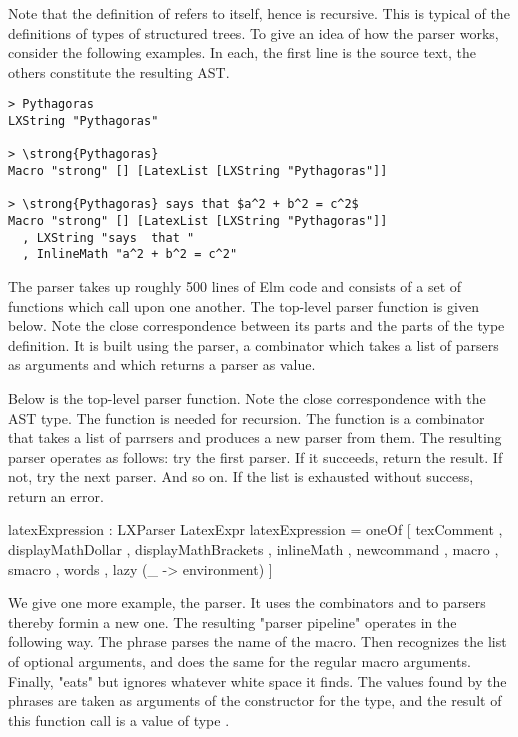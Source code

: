 Note that the definition of  refers to itself, hence is recursive.  This is typical of the definitions of types of structured trees. 
To give an idea of how the parser works, consider the following  examples.  In each, the first line is the source text, the others constitute the resulting AST.

\begin{verbatim}
> Pythagoras
LXString "Pythagoras"

> \strong{Pythagoras}
Macro "strong" [] [LatexList [LXString "Pythagoras"]]

> \strong{Pythagoras} says that $a^2 + b^2 = c^2$
Macro "strong" [] [LatexList [LXString "Pythagoras"]]
  , LXString "says  that "
  , InlineMath "a^2 + b^2 = c^2"
\end{verbatim}


The parser takes up roughly 500 lines of Elm code and consists of a set of functions which call upon one another.  The top-level parser function is given below.  Note the close correspondence between its parts and the parts of the type definition.  It is built using the  parser, a combinator which takes a list of parsers as arguments and which returns a parser as value.

Below is the top-level parser function.  Note the close correspondence
with the AST type.  The  function is needed for recursion.  The  function is a combinator that takes a list of parrsers and produces a new parser from them.  The resulting parser operates as follows: try the first parser.  If it succeeds, return the result.  If not, try the next parser.  And so on.  If the list is exhausted without success, return an error.

\begin{listing}
latexExpression : LXParser LatexExpr
latexExpression =
    oneOf
        [ texComment
        , displayMathDollar
        , displayMathBrackets
        , inlineMath
        , newcommand
        , macro
        , smacro
        , words
        , lazy (\_ -> environment)
        ]
\end{listing}

We give one more example, the  parser.  It uses the combinators \code{(|=)} and  to  parsers thereby formin a new one.  The resulting "parser pipeline" operates  in the following way.   The phrase  parses the name of the macro.  Then  recognizes the list of optional arguments, and  does the same for the regular macro arguments.  Finally,  "eats" but ignores whatever white space it finds.  The values  found by the \code{(|=)} phrases are taken as arguments of  the constructor  for the  type, and the result of this function call is a value of type .  


